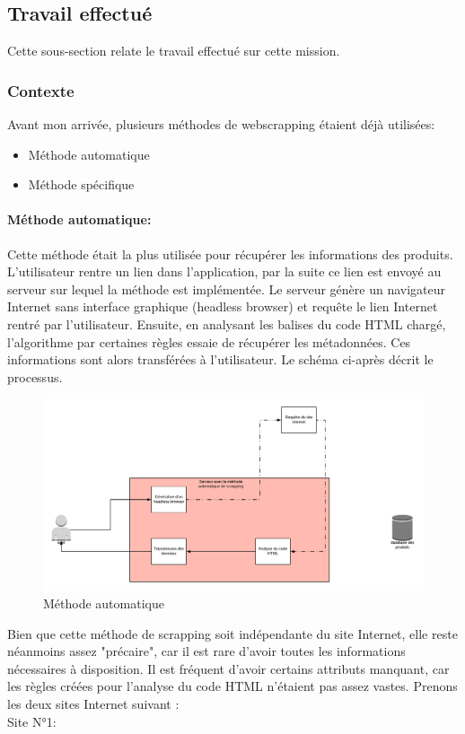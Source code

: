 \documentclass{article} %
\begin{document}
\subsection{Travail effectué}
Cette sous-section relate le travail effectué sur cette mission.
\subsubsection{Contexte\\}
Avant mon arrivée, plusieurs méthodes de webscrapping étaient déjà utilisées:
\begin{itemize}
 \itemsep 0em
 \item Méthode automatique
 \item Méthode spécifique
\end{itemize}
\paragraph{Méthode automatique:\\}
Cette méthode était la plus utilisée pour récupérer les informations des produits. L'utilisateur rentre un lien dans l'application, par la suite ce lien est envoyé au serveur sur lequel la méthode est implémentée. Le serveur génère un navigateur Internet sans interface graphique (headless browser) et requête le lien Internet rentré par l'utilisateur. Ensuite, en analysant les balises du code HTML chargé, l'algorithme par certaines règles essaie de récupérer les métadonnées. Ces informations sont alors transférées à l'utilisateur. Le schéma ci-après décrit le processus.
\begin{figure}[!h]
 \centering
 \includegraphics[keepaspectratio = true,scale=0.6]{browserInject.png}
 \caption{Méthode automatique}
\end{figure}
Bien que cette méthode de scrapping soit indépendante du site Internet, elle reste néanmoins assez "précaire", car il est rare d'avoir toutes les informations nécessaires à disposition. Il est fréquent d'avoir certains attributs manquant, car les règles créées pour l'analyse du code HTML n'étaient pas assez vastes. Prenons les deux sites Internet suivant :\\
\newpage
Site N°1:

\end{document}
